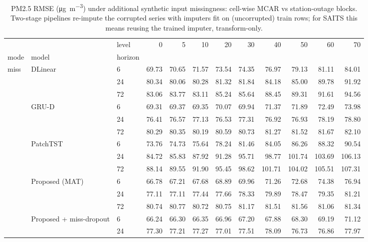 \begin{table}
\caption{PM2.5 RMSE (\si{\micro\gram\per\cubic\metre}) under additional synthetic input missingness: cell-wise MCAR vs station-outage blocks. Two-stage pipelines re-impute the corrupted series with imputers fit on (uncorrupted) train rows; for SAITS this means reusing the trained imputer, transform-only.}
\label{tab:robustness}
\begin{tabular}{lllrrrrrrrrr}
\toprule
 &  & level & 0 & 5 & 10 & 20 & 30 & 40 & 50 & 60 & 70 \\
mode & model & horizon &  &  &  &  &  &  &  &  &  \\
\midrule
\multirow[t]{24}{*}{miss} & \multirow[t]{3}{*}{DLinear} & 6 & 69.73 & 70.65 & 71.57 & 73.54 & 74.35 & 76.97 & 79.13 & 81.11 & 84.01 \\
 &  & 24 & 80.34 & 80.06 & 80.28 & 81.32 & 81.84 & 84.18 & 85.00 & 89.78 & 91.92 \\
 &  & 72 & 83.06 & 83.77 & 83.11 & 85.24 & 85.64 & 88.45 & 89.31 & 91.61 & 94.56 \\
\cline{2-12}
 & \multirow[t]{3}{*}{GRU-D} & 6 & 69.31 & 69.37 & 69.35 & 70.07 & 69.94 & 71.37 & 71.89 & 72.49 & 73.98 \\
 &  & 24 & 76.41 & 76.57 & 77.13 & 76.53 & 77.31 & 76.92 & 76.93 & 78.19 & 78.80 \\
 &  & 72 & 80.29 & 80.35 & 80.19 & 80.59 & 80.73 & 81.27 & 81.52 & 81.67 & 82.10 \\
\cline{2-12}
 & \multirow[t]{3}{*}{PatchTST} & 6 & 73.76 & 74.73 & 75.64 & 78.24 & 81.46 & 84.05 & 86.26 & 88.32 & 90.54 \\
 &  & 24 & 84.72 & 85.83 & 87.92 & 91.28 & 95.71 & 98.77 & 101.74 & 103.69 & 106.13 \\
 &  & 72 & 88.14 & 89.55 & 91.90 & 95.45 & 98.62 & 101.71 & 104.02 & 105.51 & 107.31 \\
\cline{2-12}
 & \multirow[t]{3}{*}{Proposed (MAT)} & 6 & 66.78 & 67.21 & 67.68 & 68.89 & 69.96 & 71.26 & 72.68 & 74.38 & 76.94 \\
 &  & 24 & 77.11 & 77.11 & 77.44 & 77.66 & 78.33 & 79.89 & 78.47 & 79.35 & 81.21 \\
 &  & 72 & 80.74 & 80.77 & 80.72 & 80.75 & 81.17 & 81.51 & 81.56 & 81.06 & 81.34 \\
\cline{2-12}
 & \multirow[t]{3}{*}{Proposed + miss-dropout} & 6 & 66.24 & 66.30 & 66.35 & 66.96 & 67.20 & 67.88 & 68.30 & 69.19 & 71.12 \\
 &  & 24 & 77.30 & 77.21 & 77.27 & 77.01 & 77.51 & 78.09 & 76.73 & 76.86 & 77.97 \\

\end{tabular}
\end{table}
